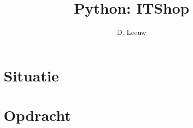 \documentclass[a4paper,12pt,twoside,openright,titlepage]{article}
\author{D. Leeuw}
\title{Python: ITShop}
\date{\today\\
0.5.0\\
\vfill
\raggedright
\copyright\ 2025-2026 Dennis Leeuw\\
}
\begin{document}

\maketitle



\section{Situatie}


\section{Opdracht}


\printindex
\end{document}
